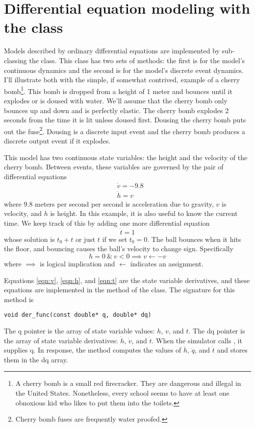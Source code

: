 \section{Differential equation modeling with the  class}
Models described by ordinary differential equations are implemented by sub-classing the  class. This class has two sets of methods: the first is for the model's continuous dynamics and the second is for the model's discrete event dynamics. I'll illustrate both with the simple, if somewhat contrived, example of a cherry bomb\footnote{A cherry bomb is a small red firecracker. They are dangerous and illegal in the United States. Nonetheless, every school seems to have at least one obnoxious kid who likes to put them into the toilets.}. This bomb is dropped from a height of 1 meter and bounces until it explodes or is doused with water. We'll assume that the cherry bomb only bounces up and down and is perfectly elastic. The cherry bomb explodes 2 seconds from the time it is lit unless doused first. Dousing the cherry bomb puts out the fuse\footnote{Cherry bomb fuses are frequently water proofed.}. Dousing is a discrete input event and the cherry bomb produces a discrete output event if it explodes. 

This model has two continuous state variables: the height and the velocity of the cherry bomb. Between events, these variables are governed by the pair of differential equations
\begin{align}
&\dot{v} = -9.8 \label{eqn:v} \\
&\dot{h} = v \label{eqn:h}
\end{align}
where $9.8$ meters per second per second is acceleration due to gravity, $v$ is velocity, and $h$ is height. In this example, it is also useful to know the current time. We keep track of this by adding one more differential equation
\begin{equation}
\dot{t} = 1 \label{eqn:t}
\end{equation}
whose solution is $t_0 + t$ or just $t$ if we set $t_0 = 0$. The ball bounces when it hits the floor, and bouncing causes the ball's velocity to change sign. Specifically
\begin{equation}
h = 0 \ \& \ v < 0 \implies v \leftarrow -v \label{eqn:state_event}
\end{equation}
where $\implies$ is logical implication and $\leftarrow$ indicates an assignment. 

Equations \ref{eqn:v}, \ref{eqn:h}, and \ref{eqn:t} are the state variable derivatives, and these equations are implemented in the  method of the  class. The signature for this method is
\begin{verbatim}
void der_func(const double* q, double* dq)
\end{verbatim}
The q pointer is the array of state variable values: $h$, $v$, and $t$. The dq pointer is the array of state variable derivatives: $\dot{h}$, $\dot{v}$, and $\dot{t}$. When the simulator calls , it supplies q. In response, the method computes the values of $\dot{h}$, $\dot{q}$, and $\dot{t}$ and stores them in the dq array.


